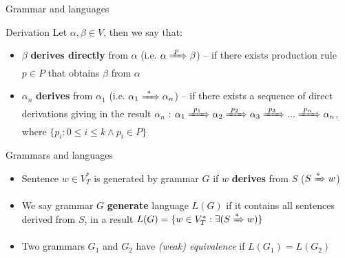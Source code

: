 \documentclass{beamer}
\begin{document}
\begin{frame}{Grammar and languages}
	
	\begin{block}{Derivation}
		Let $\alpha, \beta \in V$, then we say that:
		\begin{itemize}
			\item $\beta$ \textbf{derives directly} from $\alpha$ (i.e. $\alpha \xRightarrow{\ p\ } \beta$) -- if there exists production rule $p\in P$ that obtains $\beta$ from $\alpha$
			\item $\alpha_n$ \textbf{derives} from $\alpha_1$ (i.e. $\alpha_1 \xRightarrow{\ *\ }\alpha_n$) -- if there exists a sequence of direct derivations giving in the result $\alpha_n$ : $\alpha_1\xRightarrow{\ p_1\ }\alpha_2\xRightarrow{\ p_2\ }\alpha_3\xRightarrow{\ p_3\ }...\xRightarrow{\ p_n\ }\alpha_n$, where $\{p_i : 0\leq i\leq k \land p_i\in P\}$  
		\end{itemize}
	\end{block}
	
 	\begin{block}{Grammars and languages}
 		\begin{itemize}
 			\item Sentence $w\in V_T^*$ is generated by grammar $G$ if $w$ \textbf{derives} from $S$ ($S \xRightarrow{*} w$)
	 		\item We say grammar $G$ \textbf{generate} language $L(G)$ if it contains all sentences derived from $S$, in a result $L(G) = \{w\in V_T^*: \exists (S \xRightarrow{*} w)\}$
	 		\item Two grammars $G_1$ and $G_2$ have \textit{(weak) equivalence} if $L(G_1) = L(G_2)$
	 	\end{itemize}
	 \end{block}

\end{frame}

\end{document}
